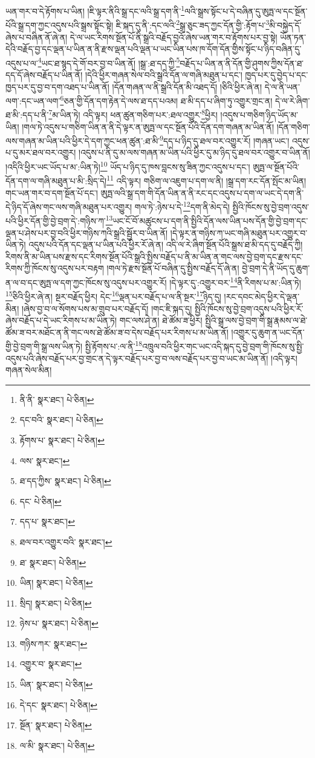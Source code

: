 ཡན་གར་བ་དེ་རྟོགས་པ་ཡིན། །ཇི་ལྟར་ནིའི་སྒྲ་དང་ལའི་སྒྲ་དག་ནི་\footnote{ནི་ནི་  སྣར་ཐང་།  པེ་ཅིན། }ལའི་སྒྲས་སྟོང་པ་དེ་བཞིན་དུ་ཨུཏྤ་ལ་དང་སྔོན་པོའི་སྒྲ་དག་ཀྱང་འདུས་པའི་སྒྲས་སྟོང་སྟེ། ཇི་སྐད་དུ་ནི་:དང་ལའི་\footnote{དང་བའི་  སྣར་ཐང་།  པེ་ཅིན། }སྒྲ་ཅུང་ཟད་ཀྱང་དོན་གྱི་:རྟོག་པ་\footnote{རྟོགས་པ་  སྣར་ཐང་།  པེ་ཅིན། }མི་བསྐྱེད་དོ་ཞེས་པ་བཞིན་ནོ་ཞེ་ན། དེ་ལ་ཡང་རིགས་སྔོན་པོ་ནི་སྒྲའི་བརྗོད་བྱའོ་ཞེས་ཡན་གར་བ་རྟོགས་པར་བྱ་སྟེ། ཡོན་ཏན་དེའི་བརྗོད་བྱ་དང་ལྡན་པ་ཡིན་ན་ནི་རྫས་ལྡན་པའི་ལྡན་པ་ཡང་ཡིན་པས་ཁ་དོག་དོན་གྱིས་སྟོང་པ་ཉིད་བཞིན་དུ་འདུས་པ་ལ་\footnote{ལས་  སྣར་ཐང་། }ཡང་ཐ་སྙད་དེ་གོ་བར་བྱ་བ་ཡིན་ནོ། །སྒྲ་:ཐ་དད་ཀྱི་\footnote{ཐ་དད་ཀྱིས་  སྣར་ཐང་།  པེ་ཅིན། }བརྗོད་པ་ཡིན་ན་ནི་དོན་གྱི་ཤུགས་ཀྱིས་དོན་ཐ་དད་དོ་ཞེས་བརྗོད་པ་ཡིན་ནོ། །དེའི་ཕྱིར་གཞན་སེལ་བའི་སྒྲའི་དོན་ལ་གཞི་མཐུན་པ་དང་། ཁྱད་པར་དུ་བྱེད་པ་དང་ཁྱད་པར་དུ་བྱ་བ་དག་འཐད་པ་ཡིན་ནོ། །དོན་གཞན་ལ་ནི་སྒྲའི་དོན་མི་འཐད་དོ། །ཅིའི་ཕྱིར་ཞེ་ན། དེ་ལ་ནི་ཡན་ལག་:དང་ཡན་ལག་\footnote{དང་  པེ་ཅིན། }ཅན་གྱི་དོན་དག་རྟེན་དེ་ལས་ཐ་དད་པའམ། ཐ་མི་དད་པ་ཞིག་ཏུ་འགྱུར་གྲང་ན། དེ་ལ་རེ་ཞིག་ཐ་མི་:དད་པ་ནི་\footnote{དད་པ་  སྣར་ཐང་། }མ་ཡིན་ཏེ། འདི་ལྟར། ཕན་ཚུན་གཅིག་པར་:ཐལ་འགྱུར་\footnote{ཐལ་བར་འགྱུར་བའི་  སྣར་ཐང་། }ཕྱིར། །འདུས་པ་གཅིག་ཉིད་ཡོད་མ་ཡིན། །གལ་ཏེ་འདུས་པ་གཅིག་ཡིན་ན་ནི་དེ་ལྟར་ན་ཨུཏྤ་ལ་དང་སྔོན་པོའི་དོན་དག་གཞན་མ་ཡིན་ནོ། །དོན་གཅིག་ལས་གཞན་མ་ཡིན་པའི་ཕྱིར་དེ་དག་ཀྱང་ཕན་ཚུན་:ཐ་མི་\footnote{ཐ་  སྣར་ཐང་།  པེ་ཅིན། }དད་པ་ཉིད་དུ་ཐལ་བར་འགྱུར་རོ། །གཞན་ཡང་། འདུས་པ་དུ་མར་ཐལ་བར་འགྱུར། །འདུས་པ་ནི་དུ་མ་ལས་གཞན་མ་ཡིན་པའི་ཕྱིར་དུ་མ་ཉིད་དུ་ཐལ་བར་འགྱུར་བ་ཡིན་ནོ། །འདིའི་ཕྱིར་ཡང་ཡོད་པ་མ་:ཡིན་ཏེ།\footnote{ཡིན།  སྣར་ཐང་།  པེ་ཅིན། } ཡོད་པ་ཉིད་དུ་ཁས་བླངས་སུ་ཟིན་ཀྱང་འདུས་པ་དང་། ཨུཏྤ་ལ་སྔོན་པོའི་དོན་དག་ལ་གཞི་མཐུན་པ་མི་:སྲིད་དེ།\footnote{སྲིད།  སྣར་ཐང་།  པེ་ཅིན། } འདི་ལྟར། གཅིག་ལ་འཇུག་པ་དག་ལ་ནི། །སྒྲ་དག་རང་དོན་སྤོང་མ་ཡིན། གང་ཡན་གར་བ་དག་སྔོན་པོ་དང་། ཨུཏྤ་ལའི་སྒྲ་དག་གི་དོན་ཡིན་ན་ནི་རང་དང་འདུས་པ་དག་ལ་ཡང་དེ་དག་ནི་དེ་ཉིད་དོ་ཞེས་གང་ལས་གཞི་མཐུན་པར་འགྱུར། གལ་ཏེ་:ཉེས་པ་དེ་\footnote{ཉེས་པ་  སྣར་ཐང་།  པེ་ཅིན། }དག་ནི་མེད་དེ། སྤྱིའི་ཁོངས་སུ་བྱེ་བྲག་འདུས་པའི་ཕྱིར་དོན་གྱི་བྱེ་བྲག་དེ་:གཉིས་ཀ་\footnote{གཉིས་ཀར་  སྣར་ཐང་། }ཡང་ངོ་བོ་མཚུངས་པ་དག་ནི་སྤྱིའི་དོན་ལས་ཡིན་པས་དོན་གྱི་བྱེ་བྲག་དང་ལྡན་པ་ཤེས་པར་བྱ་བའི་ཕྱིར་གཉིས་ཀའི་སྒྲའི་སྦྱོར་བ་ཡིན་ནོ། །དེ་ལྟར་ན་གཉིས་ཀ་ཡང་གཞི་མཐུན་པར་འགྱུར་བ་ཡིན་ཏེ། འདུས་པའི་དོན་དང་ལྡན་པ་ཡིན་པའི་ཕྱིར་རོ་ཞེ་ན། འདི་ལ་རེ་ཞིག་སྔོན་པོའི་སྒྲས་ཐ་མི་དད་དུ་བརྗོད་ཀྱི། རིགས་ནི་མ་ཡིན་པས་རྫས་དང་རིགས་སྔོན་པོའི་སྒྲའི་སྤྱིས་བརྗོད་པ་ནི་མ་ཡིན་ན་གང་ལས་བྱེ་བྲག་དང་རྫས་དང་རིགས་ཀྱི་ཁོངས་སུ་འདུས་པར་བརྟག །གལ་ཏེ་རྫས་སྔོན་པོ་བཞིན་དུ་སྤྱིས་བརྗོད་དོ་ཞེ་ན། བྱེ་བྲག་དེ་ནི་ཡོད་དུ་ཆུག་ན་ལ་བ་དང་ཨུཏྤ་ལ་དག་ཀྱང་ཁོངས་སུ་འདུས་པར་འགྱུར་རོ། །དེ་ལྟར་དུ་:འགྱུར་བར་\footnote{འགྱུར་བ་  སྣར་ཐང་། }ནི་རིགས་པ་མ་:ཡིན་ཏེ། \footnote{ཡིན་  སྣར་ཐང་།  པེ་ཅིན། }ཅིའི་ཕྱིར་ཞེ་ན། སྔར་བརྗོད་ཕྱིར། དེང་\footnote{དེ་དང་  སྣར་ཐང་།  པེ་ཅིན། }ལྡན་པར་བརྗོད་པ་ལ་ནི་སྔར་\footnote{སྔོན་  སྣར་ཐང་།  པེ་ཅིན། }ཉིད་དུ། །རང་དབང་མེད་ཕྱིར་དེ་ལྡན་མིན། །ཞེས་བྱ་བ་ལ་སོགས་པས་མ་གྲུབ་པར་བརྗོད་དོ། །གང་ཇི་སྐད་དུ། སྤྱིའི་ཁོངས་སུ་བྱེ་བྲག་འདུས་པའི་ཕྱིར་རོ་ཞེས་བརྗོད་པ་དེ་ཡང་རིགས་པ་མ་ཡིན་ཏེ། གང་ལས་ཤེ་ན། ཐེ་ཚོམ་ཟ་ཕྱིར། སྤྱིའི་སྒྲ་ལས་བྱེ་བྲག་གི་སྒྲ་རྣམས་ལ་ཐེ་ཚོམ་ཟ་བར་མཐོང་ན་ནི་གང་ལས་ཐེ་ཚོམ་ཟ་བ་དེས་བརྗོད་པར་རིགས་པ་མ་ཡིན་ནོ། །འགྱུར་དུ་ཆུག་ན་ཡང་དོན་གྱི་བྱེ་བྲག་གི་སྒྲ་ལས་ཡིན་ཏེ། སྤྱི་རྟོགས་པ་:ལ་ནི་\footnote{ལ་མི་  སྣར་ཐང་།  པེ་ཅིན། }འཁྲུལ་བའི་ཕྱིར་གང་ཡང་འདི་སྐད་དུ་བྱེ་བྲག་གི་ཁོངས་སུ་སྤྱི་འདུས་པའི་ཞེས་བརྗོད་པར་བྱ་གྲང་ན་དེ་ལྟར་བརྗོད་པར་བྱ་བ་ལས་བརྗོད་པར་བྱ་བ་ཡང་མ་ཡིན་ནོ། །འདི་ལྟར། གཞན་སེལ་མིན། 